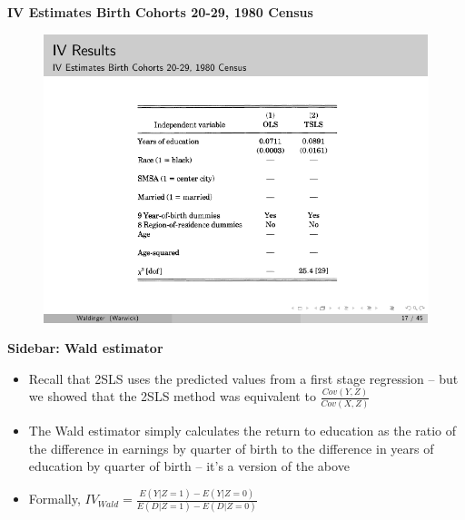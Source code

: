\documentclass[notes=show]{beamer}
\begin{document}
\begin{frame}[plain]

	\begin{center}
	\textbf{IV Estimates Birth Cohorts 20-29, 1980 Census}
	\end{center}
	
	\begin{figure}
	\includegraphics{./lecture_includes/qob_7.pdf}
	\end{figure}
	
\end{frame}


	\begin{frame}[plain]
	\begin{center}
	\textbf{Sidebar: Wald estimator}
	\end{center}
	
	\begin{itemize}
	\item Recall that 2SLS uses the predicted values from a first stage regression -- but we showed that the 2SLS method was equivalent to $\frac{Cov(Y,Z)}{Cov(X,Z)}$
	\item The Wald estimator simply calculates the return to education as the ratio of the difference in earnings by quarter of birth to the difference in years of education by quarter of birth -- it's a version of the above
	\item Formally, $IV_{Wald} = \frac{E(Y|Z=1) - E(Y|Z=0)}{E(D|Z=1) - E(D|Z=0)}$
	\end{itemize}
\end{frame}
\end{document}
